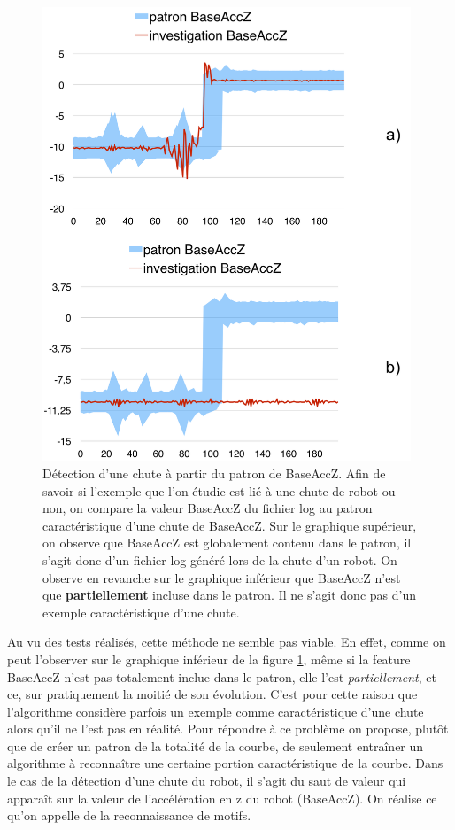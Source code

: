 \begin{figure}[H]
	\centering\includegraphics[width=11cm]{images/patron_comp.png}
	\caption[Détection d'une chute à partir du patron de BaseAccZ]{Détection d'une chute à partir du patron de BaseAccZ. Afin de savoir si l'exemple que l'on étudie est lié à une chute de robot ou non, on compare la valeur BaseAccZ du fichier log au patron caractéristique d'une chute de BaseAccZ. Sur le graphique supérieur, on observe que BaseAccZ est globalement contenu dans le patron, il s'agit donc d'un fichier log généré lors de la chute d'un robot. On observe en revanche sur le graphique inférieur que BaseAccZ n'est que \textbf{partiellement} incluse dans le patron. Il ne s'agit donc pas d'un exemple caractéristique d'une chute. }
	\label{fig:Détection d'une chute à partir du patron de BaseAccZ}
\end{figure}

Au vu des tests réalisés, cette méthode ne semble pas viable. En effet, comme on peut l'observer sur le graphique inférieur de la figure \ref{fig:Détection d'une chute à partir du patron de BaseAccZ}, même si la feature BaseAccZ n'est pas totalement inclue dans le patron, elle l'est \emph{partiellement}, et ce, sur pratiquement la moitié de son évolution. C'est pour cette raison que l'algorithme considère parfois un exemple comme caractéristique d'une chute alors qu'il ne l'est pas en réalité. Pour répondre à ce problème on propose, plutôt que de créer un patron de la totalité de la courbe, de seulement entraîner un algorithme à reconnaître une certaine portion caractéristique de la courbe. Dans le cas de la détection d'une chute du robot, il s'agit du saut de valeur qui apparaît sur la valeur de l'accélération en z du robot (BaseAccZ). On réalise ce qu'on appelle de la reconnaissance de motifs. 


